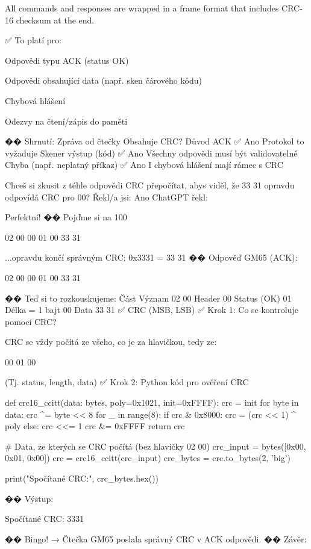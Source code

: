     All commands and responses are wrapped in a frame format that includes CRC-16 checksum at the end.

✅ To platí pro:

    Odpovědi typu ACK (status OK)

    Odpovědi obsahující data (např. sken čárového kódu)

    Chybová hlášení

    Odezvy na čtení/zápis do paměti

�� Shrnutí:
Zpráva od čtečky	Obsahuje CRC?	Důvod
ACK	✅ Ano	Protokol to vyžaduje
Skener výstup (kód)	✅ Ano	Všechny odpovědi musí být validovatelné
Chyba (např. neplatný příkaz)	✅ Ano	I chybová hlášení mají rámec s CRC

Chceš si zkusit z téhle odpovědi CRC přepočítat, abys viděl, že 33 31 opravdu odpovídá CRC pro 00?
Řekl/a jsi:
Ano
ChatGPT řekl:

Perfektní! �� Pojďme si na 100 %

02 00 00 01 00 33 31

...opravdu končí správným CRC: 0x3331 = 33 31
�� Odpověď GM65 (ACK):

02 00 00 01 00 33 31

�� Teď si to rozkouskujeme:
Část	Význam
02 00	Header
00	Status (OK)
01	Délka = 1 bajt
00	Data
33 31	✅ CRC (MSB, LSB)
✅ Krok 1: Co se kontroluje pomocí CRC?

CRC se vždy počítá ze všeho, co je za hlavičkou, tedy ze:

00 01 00

(Tj. status, length, data)
✅ Krok 2: Python kód pro ověření CRC

def crc16_ccitt(data: bytes, poly=0x1021, init=0xFFFF):
    crc = init
    for byte in data:
        crc ^= byte << 8
        for _ in range(8):
            if crc & 0x8000:
                crc = (crc << 1) ^ poly
            else:
                crc <<= 1
            crc &= 0xFFFF
    return crc

# Data, ze kterých se CRC počítá (bez hlavičky 02 00)
crc_input = bytes([0x00, 0x01, 0x00])
crc = crc16_ccitt(crc_input)
crc_bytes = crc.to_bytes(2, 'big')

print("Spočítané CRC:", crc_bytes.hex())

�� Výstup:

Spočítané CRC: 3331

�� Bingo! → Čtečka GM65 poslala správný CRC v ACK odpovědi.
�� Závěr:

